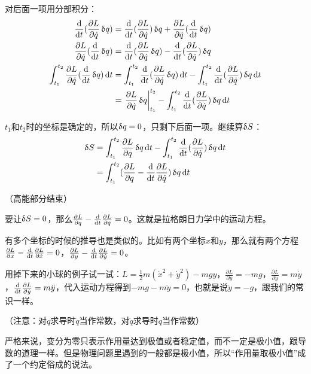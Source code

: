 对后面一项用分部积分：
\begin{align*}
\opdt(\frac{\partial L}{\partial \dot q} \opvar q)&=\opdt(\frac{\partial L}{\partial \dot q}) \opvar q+\frac{\partial L}{\partial \dot q} (\opdt \opvar q) \\
\frac{\partial L}{\partial \dot q} (\opdt \opvar q)&=\opdt(\frac{\partial L}{\partial \dot q} \opvar q)-\opdt(\frac{\partial L}{\partial \dot q}) \opvar q \\
\int_{t_1}^{t_2}\frac{\partial L}{\partial \dot q} (\opdt \opvar q) \opd t&=\int_{t_1}^{t_2} \opdt(\frac{\partial L}{\partial \dot q} \opvar q) \opd t-\int_{t_1}^{t_2}\opdt(\frac{\partial L}{\partial \dot q}) \opvar q \opd t\\
&=\left. \frac{\partial L}{\partial \dot q} \opvar q \right|_{t_1}^{t_2}-\int_{t_1}^{t_2}\opdt(\frac{\partial L}{\partial \dot q}) \opvar q \opd t
\end{align*}

$t_1$和$t_2$时的坐标是确定的，所以$\mathop{}\!\updelta q=0$，只剩下后面一项。继续算$\mathop{}\!\updelta S$：
\begin{align*}
\opvar S&=\int_{t_1}^{t_2}\frac{\partial L}{\partial q} \opvar q \opd t-\int_{t_1}^{t_2}\opdt(\frac{\partial L}{\partial \dot q}) \opvar q \opd t \\
&=\int_{t_1}^{t_2}(\frac{\partial L}{\partial q}-\opdt\frac{\partial L}{\partial \dot q}) \opvar q \opd t
\end{align*}

（高能部分结束）

要让$\mathop{}\!\updelta S=0$，那么$\frac{\partial L}{\partial q}-\frac{\mathop{}\!\mathrm{d}}{\mathop{}\!\mathrm{d} t} \frac{\partial L}{\partial \dot q}=0$。这就是拉格朗日力学中的运动方程。

有多个坐标的时候的推导也是类似的。比如有两个坐标$x$和$y$，那么就有两个方程$\frac{\partial L}{\partial x}-\frac{\mathop{}\!\mathrm{d}}{\mathop{}\!\mathrm{d} t} \frac{\partial L}{\partial \dot x}=0$，$\frac{\partial L}{\partial y}-\frac{\mathop{}\!\mathrm{d}}{\mathop{}\!\mathrm{d} t} \frac{\partial L}{\partial \dot y}=0$。

用掉下来的小球的例子试一试：$L=\frac{1}{2}m(\dot x^2+\dot y^2)-m g y$，$\frac{\partial L}{\partial y}=-m g$，$\frac{\partial L}{\partial \dot y}=m \dot y$，$\frac{\mathop{}\!\mathrm{d}}{\mathop{}\!\mathrm{d} t} \frac{\partial L}{\partial \dot y}=m \ddot y$，代入运动方程得到$-m g-m \ddot y=0$，也就是说$\ddot y=-g$，跟我们的常识一样。

（注意：对$q$求导时$\dot q$当作常数，对$\dot q$求导时$q$当作常数）

严格来说，变分为零只表示作用量达到极值或者稳定值，而不一定是极小值，跟导数的道理一样。但是物理问题里遇到的一般都是极小值，所以“作用量取极小值”成了一个约定俗成的说法。

